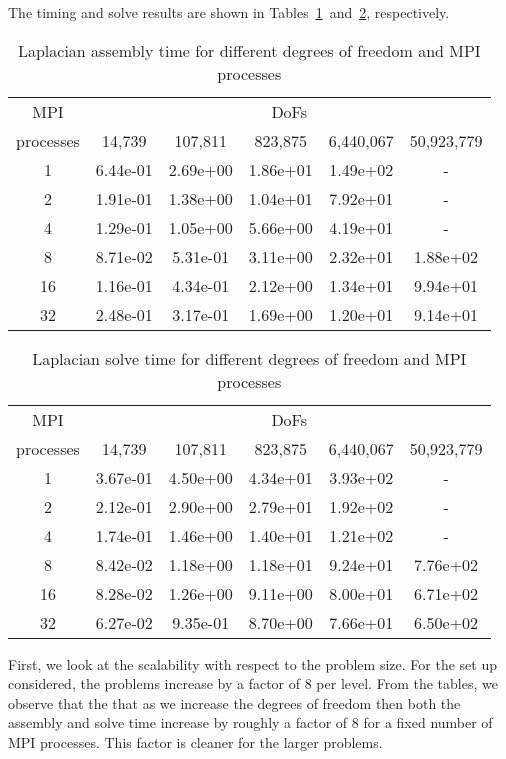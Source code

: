\documentclass[10pt]{article}
\begin{document}
The timing and solve results are shown in Tables~\ref{tab:Ltime}~and~\ref{tab:Lsolve}, respectively.
\begin{table}[h!]
    \centering
    \begin{tabular}{|c|ccccc|}
        \hline
        MPI & \multicolumn{5}{c|}{DoFs}\\
        processes &  14,739   &   107,811  &   823,875  &   6,440,067  & 50,923,779 \\
        \hline
            1  & 6.44e-01 &  2.69e+00 &  1.86e+01 &  1.49e+02 & - \\
            2  & 1.91e-01 &  1.38e+00 &  1.04e+01 &  7.92e+01 & - \\
            4  & 1.29e-01 &  1.05e+00 &  5.66e+00 &  4.19e+01 & - \\
            8  & 8.71e-02 &  5.31e-01 &  3.11e+00 &  2.32e+01 & 1.88e+02 \\
            16 & 1.16e-01 &  4.34e-01 &  2.12e+00 &  1.34e+01 & 9.94e+01 \\
            32 & 2.48e-01 &  3.17e-01 &  1.69e+00 &  1.20e+01 & 9.14e+01 \\
        \hline
    \end{tabular}
    \caption{Laplacian assembly time for different degrees of freedom and MPI processes}
    \label{tab:Ltime}
\end{table}
\begin{table}[h!]
    \centering
    \begin{tabular}{|c|ccccc|}
        \hline
        MPI & \multicolumn{5}{c|}{DoFs}\\
        processes &  14,739   &   107,811  &   823,875  &   6,440,067  & 50,923,779 \\
        \hline
        1  & 3.67e-01 &  4.50e+00 &  4.34e+01 &  3.93e+02 & - \\
        2  & 2.12e-01 &  2.90e+00 &  2.79e+01 &  1.92e+02 & - \\
        4  & 1.74e-01 &  1.46e+00 &  1.40e+01 &  1.21e+02 & - \\
        8  & 8.42e-02 &  1.18e+00 &  1.18e+01 &  9.24e+01 & 7.76e+02 \\
        16 & 8.28e-02 &  1.26e+00 &  9.11e+00 &  8.00e+01 & 6.71e+02 \\
        32 & 6.27e-02 &  9.35e-01 &  8.70e+00 &  7.66e+01 & 6.50e+02 \\
        \hline
    \end{tabular}
    \caption{Laplacian solve time for different degrees of freedom and MPI processes}
    \label{tab:Lsolve}
\end{table}
First, we look at the scalability with respect to the problem size. For the set up considered, the problems increase by a factor of 8 per level. From the tables, we observe that the that as we increase the degrees of freedom then both the assembly and solve time increase by roughly a factor of 8 for a fixed number of MPI processes. This factor is cleaner for the larger problems.
\end{document}

